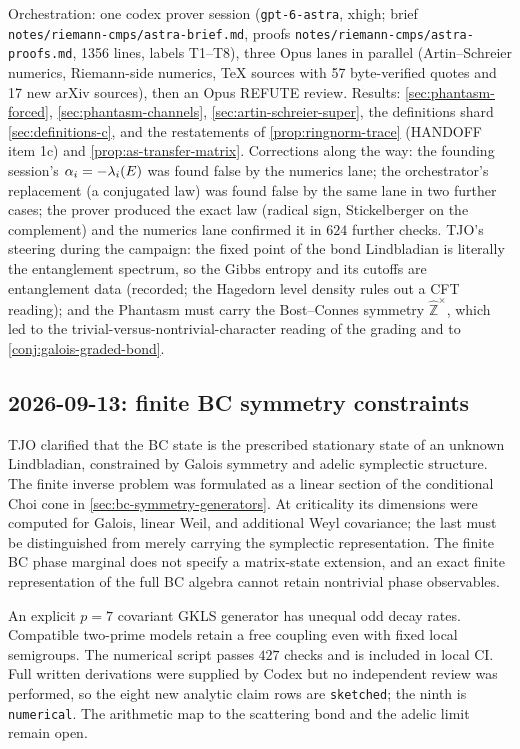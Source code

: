 Orchestration: one codex prover session (\texttt{gpt-6-astra}, xhigh; brief
\texttt{notes/riemann-cmps/astra-brief.md}, proofs
\texttt{notes/riemann-cmps/astra-proofs.md}, 1356 lines, labels T1--T8), three Opus
lanes in parallel (Artin--Schreier numerics, Riemann-side numerics, TeX sources with
57 byte-verified quotes and 17 new arXiv sources), then an Opus REFUTE review. Results:
\cref{sec:phantasm-forced}, \cref{sec:phantasm-channels},
\cref{sec:artin-schreier-super}, the definitions shard \cref{sec:definitions-c}, and the
restatements of \cref{prop:ringnorm-trace} (HANDOFF item 1c) and
\cref{prop:as-transfer-matrix}. Corrections along the way: the founding session's
$\alpha_{i} = -\lambda_i(E)$ was found false by the numerics lane; the orchestrator's
replacement (a conjugated law) was found false by the same lane in two further cases; the
prover produced the exact law (radical sign, Stickelberger on the complement) and the
numerics lane confirmed it in $624$ further checks. TJO's steering during the campaign: the
fixed point of the bond Lindbladian is literally the entanglement spectrum, so the Gibbs
entropy and its cutoffs are entanglement data (recorded; the Hagedorn level density rules
out a CFT reading); and the Phantasm must carry the Bost--Connes symmetry
$\hat{\mathbb Z}^\times$, which led to the trivial-versus-nontrivial-character reading of
the grading and to \cref{conj:galois-graded-bond}.

\subsection*{2026-09-13: finite BC symmetry constraints}

TJO clarified that the BC state is the prescribed stationary state of an
unknown Lindbladian, constrained by Galois symmetry and adelic symplectic
structure. The finite inverse problem was formulated as a linear section
of the conditional Choi cone in \cref{sec:bc-symmetry-generators}. At
criticality its dimensions were computed for Galois, linear Weil, and
additional Weyl covariance; the last must be distinguished from merely
carrying the symplectic representation. The finite BC phase marginal does
not specify a matrix-state extension, and an exact finite representation
of the full BC algebra cannot retain nontrivial phase observables.

An explicit $p=7$ covariant GKLS generator has unequal odd decay rates.
Compatible two-prime models retain a free coupling even with fixed local
semigroups. The numerical script passes $427$ checks and is included in
local CI. Full written derivations were supplied by Codex but no independent
review was performed, so the eight new analytic claim rows are
\texttt{sketched}; the ninth is \texttt{numerical}. The arithmetic map to
the scattering bond and the adelic limit remain open.

